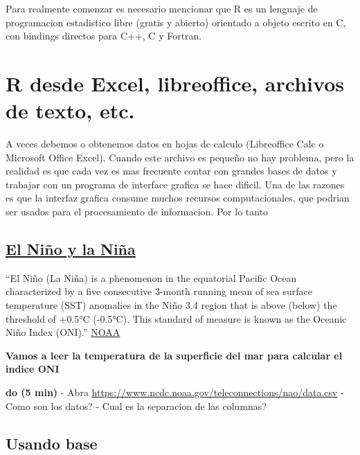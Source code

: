 \documentclass[]{book}
\begin{document}
Para realmente comenzar es necesario mencionar que R es un lenguaje de programacion estadistico libre (gratis y abierto) orientado a objeto escrito en C, con bindings directos para C++, C y Fortran.

\hypertarget{r-desde-excel-libreoffice-archivos-de-texto-etc.}{%
\section{R desde Excel, libreoffice, archivos de texto, etc.}\label{r-desde-excel-libreoffice-archivos-de-texto-etc.}}

A veces debemos o obtenemos datos en hojas de calculo (Libreoffice Calc o Microsoft Office Excel). Cuando este archivo es pequeño no hay problema, pero la realidad es que cada vez es mas frecuente contar con grandes bases de datos y trabajar con un programa de interface grafica se hace dificil. Una de las razones es que la interfaz grafica consume muchos recursos computacionales, que podrian ser usados para el procesamiento de informacion. Por lo tanto

\hypertarget{el-nino-y-la-nina}{%
\subsection{\texorpdfstring{\href{https://www.ncdc.noaa.gov/teleconnections/enso/indicators/sst/}{El Niño y la Niña}}{El Niño y la Niña}}\label{el-nino-y-la-nina}}

``El Niño (La Niña) is a phenomenon in the equatorial Pacific Ocean characterized by a five consecutive 3-month running mean of sea surface temperature (SST) anomalies in the Niño 3.4 region that is above (below) the threshold of +0.5°C (-0.5°C). This standard of measure is known as the Oceanic Niño Index (ONI).'' \href{https://www.ncdc.noaa.gov/teleconnections/enso/indicators/sst/}{NOAA}

\textbf{Vamos a leer la temperatura de la superficie del mar para calcular el indice ONI}

\textbf{do (5 min)}
- Abra \url{https://www.ncdc.noaa.gov/teleconnections/nao/data.csv}
- Como son los datos?
- Cual es la separacion de las columnas?

\hypertarget{usando-base}{%
\subsection{Usando base}\label{usando-base}}
\end{document}
